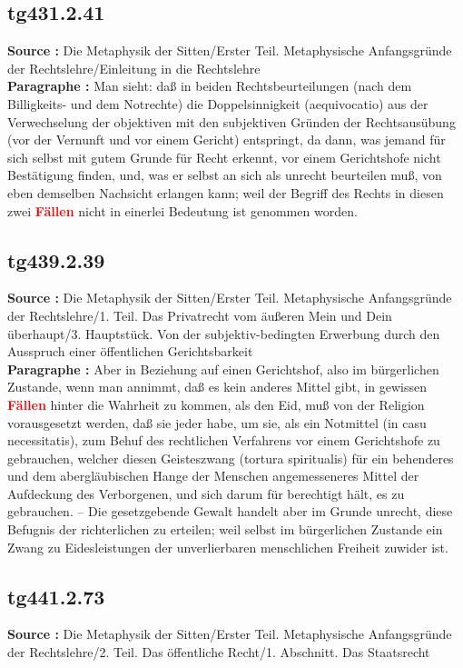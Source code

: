 \documentclass[a4paper,12pt,twoside]{book}
\newcommand{\match}[1]{\textcolor{red}{\textbf{#1}}}
\begin{document}
	\subsection*{tg431.2.41} 
	\textbf{Source : }Die Metaphysik der Sitten/Erster Teil. Metaphysische Anfangsgründe der Rechtslehre/Einleitung in die Rechtslehre\\  
	
	\textbf{Paragraphe : }Man sieht: daß in beiden Rechtsbeurteilungen (nach dem Billigkeits- und dem Notrechte) die Doppelsinnigkeit (aequivocatio) aus der Verwechselung der objektiven mit den  subjektiven Gründen der Rechtsausübung (vor der Vernunft und vor einem Gericht) entspringt, da dann, was jemand für sich selbst mit gutem Grunde für Recht erkennt, vor einem Gerichtshofe nicht Bestätigung finden, und, was er selbst an sich als unrecht beurteilen muß, von eben demselben Nachsicht erlangen kann; weil der Begriff des Rechts in diesen zwei \match{Fällen} nicht in einerlei Bedeutung ist genommen worden. 
	
	\subsection*{tg439.2.39} 
	\textbf{Source : }Die Metaphysik der Sitten/Erster Teil. Metaphysische Anfangsgründe der Rechtslehre/1. Teil. Das Privatrecht vom äußeren Mein und Dein überhaupt/3. Hauptstück. Von der subjektiv-bedingten Erwerbung durch den Ausspruch einer öffentlichen Gerichtsbarkeit\\  
	
	\textbf{Paragraphe : }Aber in Beziehung auf einen Gerichtshof, also im bürgerlichen Zustande, wenn man annimmt, daß es kein anderes Mittel gibt, in gewissen \match{Fällen} hinter die Wahrheit zu kommen, als den Eid, muß von der Religion vorausgesetzt werden, daß sie jeder habe, um sie, als ein Notmittel (in casu necessitatis), zum Behuf des rechtlichen Verfahrens vor einem Gerichtshofe zu gebrauchen, welcher diesen Geisteszwang (tortura spiritualis) für ein behenderes und dem abergläubischen Hange der Menschen angemesseneres Mittel der Aufdeckung des Verborgenen, und sich darum für berechtigt hält, es zu gebrauchen. – Die gesetzgebende Gewalt handelt aber im Grunde unrecht, diese Befugnis der richterlichen zu erteilen; weil selbst im bürgerlichen Zustande ein Zwang zu Eidesleistungen der unverlierbaren menschlichen Freiheit zuwider ist. 
	
	\subsection*{tg441.2.73} 
	\textbf{Source : }Die Metaphysik der Sitten/Erster Teil. Metaphysische Anfangsgründe der Rechtslehre/2. Teil. Das öffentliche Recht/1. Abschnitt. Das Staatsrecht\\  
	
\end{document}
